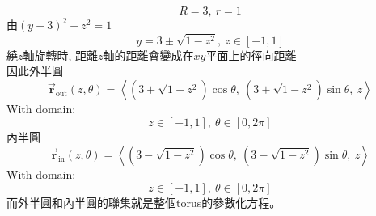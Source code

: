 ﻿\documentclass[12pt,a4paper]{article}
\begin{document}
\begin{problems}
\begin{equation}
  R=3,~r=1
\end{equation}
由$(y-3)^2+z^2=1$
\begin{equation}
  y = 3\pm\sqrt{1-z^2},~z\in[-1,1]
\end{equation}
繞$z$軸旋轉時, 距離$z$軸的距離會變成在$xy$平面上的徑向距離\\
因此外半圓
\begin{equation}
  \vec{\bm{r}}_{\text{out}}(z,\theta) = \left<
    \left(
      3+\sqrt{1-z^2}
    \right) \cos\theta,~
    \left(
      3+\sqrt{1-z^2}
    \right) \sin\theta,~
    z
  \right>
\end{equation}
With domain:
\begin{equation}
  z\in[-1,1],~\theta\in[0,2\pi]
\end{equation}
內半圓
\begin{equation}
  \vec{\bm{r}}_{\text{in}}(z,\theta) = \left<
    \left(
      3-\sqrt{1-z^2}
    \right) \cos\theta,~
    \left(
      3-\sqrt{1-z^2}
    \right) \sin\theta,~
    z
  \right>
\end{equation}
With domain:
\begin{equation}
  z\in[-1,1],~\theta\in[0,2\pi]
\end{equation}
而外半圓和內半圓的聯集就是整個torus的參數化方程。
\end{problems}
\end{document}
